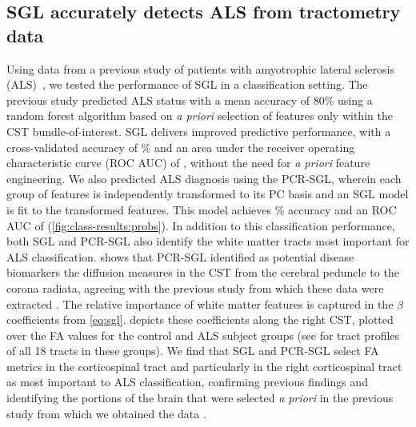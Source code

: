 \documentclass[10pt,letterpaper]{article}
\begin{document}
\subsection*{SGL accurately detects ALS from tractometry data}

Using data from a previous study of patients with amyotrophic lateral sclerosis (ALS)~\cite{sarica2017corticospinal}, we tested the performance of SGL in a
classification setting. The previous study predicted ALS status with a mean
accuracy of 80\% using a random forest algorithm based on \emph{a priori}
selection of features only within the CST bundle-of-interest.
SGL delivers improved predictive performance, with a cross-validated accuracy
of {\alsAccuracy}\% and an area under the receiver operating characteristic
curve (ROC AUC) of {\alsRocAuc}, without the need for \emph{a priori} feature
engineering.
We also predicted ALS diagnosis using the PCR-SGL, wherein each group of features is independently transformed to its PC basis and an SGL model is fit to the transformed features. This model achieves \protect{\alsAccuracyGpca}\% accuracy and an ROC AUC of \protect{\alsRocAucGpca}
(\cref{fig:class-results:probs}). In addition to this classification
performance, both SGL and PCR-SGL also identify
the white matter tracts most important for ALS classification.
 shows that PCR-SGL identified as potential disease biomarkers the diffusion measures in the CST from the cerebral peduncle to the corona radiata, agreeing with the previous study from which these data were extracted \cite{sarica2017corticospinal}.
The relative importance of white matter
features is captured in the $\beta$ coefficients from \cref{eq:sgl}.
 depicts these coefficients along the
right CST, plotted over the FA values for the control and ALS subject groups
(see  for tract profiles of all 18 tracts in these groups).
We find that SGL and PCR-SGL select FA metrics in the corticospinal tract and
particularly in the right corticospinal tract as most important to ALS
classification, confirming previous findings \cite{van2011upper,
toosy2003diffusion, sarica2014tractography, sage2007quantitative,
sage2009quantitative, karlsborg2004corticospinal, ellis1999diffusion,
cosottini2005diffusion, ciccarelli2009investigation, abe2010voxel} and
identifying the portions of the brain that were selected \emph{a priori} in
the previous study from which we obtained the data
\cite{sarica2017corticospinal}.
\end{document}
